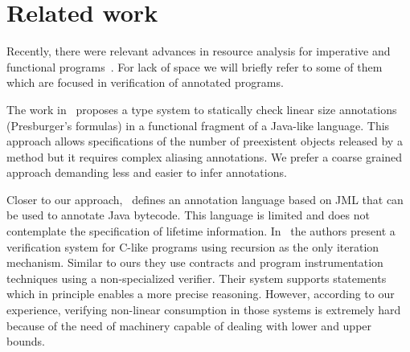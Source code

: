 \section{Related work} \label{sec:relatedwork}
Recently, there were relevant advances in resource analysis for imperative and functional programs~\cite{chin05SAS,BarthePS05,garber08ismm,AlbertGG09,he2009memory,gulwani2010reachability,hoffmann2010amortized}.
For lack of space we will  briefly refer to some of them which are focused in verification of annotated programs. 

The work in~\cite{chin05SAS}  proposes a type system to statically check linear size annotations (Presburger's formulas) in a functional fragment of a Java-like language. This approach allows  specifications of the number of preexistent objects released  by a method but it requires  complex aliasing annotations. We prefer a coarse grained approach demanding less and easier to infer annotations.

Closer to our approach,~\cite{BarthePS05} defines an annotation language based on JML that can be used to annotate Java bytecode. This language is limited and does not contemplate the specification of lifetime information. In~\cite{he2009memory} the authors present a verification system for C-like programs using recursion as the only iteration mechanism. Similar to ours they use contracts and program instrumentation techniques using a non-specialized verifier. Their system supports  statements which in principle enables a more precise reasoning. However, according to our experience, verifying non-linear consumption in those systems is extremely hard because of the need of machinery capable of dealing with lower and upper bounds. 